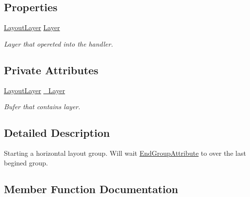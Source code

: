 \subsection*{Properties}
\begin{DoxyCompactItemize}
\item 
\mbox{\hyperlink{class_wpf_handler_1_1_u_i_1_1_auto_layout_1_1_layout_layer}{Layout\+Layer}} \mbox{\hyperlink{class_wpf_handler_1_1_u_i_1_1_auto_layout_1_1_configuration_1_1_begin_horizontal_group_attribute_afbdce9f3ac40b7f4bd6f2f675beafe36}{Layer}}
\begin{DoxyCompactList}\small\item\em Layer that opereted into the handler. \end{DoxyCompactList}\end{DoxyCompactItemize}
\subsection*{Private Attributes}
\begin{DoxyCompactItemize}
\item 
\mbox{\hyperlink{class_wpf_handler_1_1_u_i_1_1_auto_layout_1_1_layout_layer}{Layout\+Layer}} \mbox{\hyperlink{class_wpf_handler_1_1_u_i_1_1_auto_layout_1_1_configuration_1_1_begin_horizontal_group_attribute_af50995071c008ef3fff87aa189a8256f}{\+\_\+\+Layer}}
\begin{DoxyCompactList}\small\item\em Bufer that contains layer. \end{DoxyCompactList}\end{DoxyCompactItemize}


\subsection{Detailed Description}
Starting a horizontal layout group. Will wait \mbox{\hyperlink{class_wpf_handler_1_1_u_i_1_1_auto_layout_1_1_configuration_1_1_end_group_attribute}{End\+Group\+Attribute}} to over the last begined group. 



\subsection{Member Function Documentation}
\mbox{\label{class_wpf_handler_1_1_u_i_1_1_auto_layout_1_1_configuration_1_1_begin_horizontal_group_attribute_a8bb61f969389bece86c87fbfa44d4c82}} 
